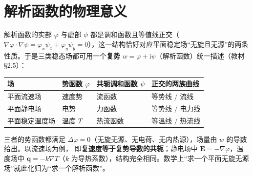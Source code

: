 \section{解析函数的物理意义}

解析函数的实部 \(\varphi\) 与虚部 \(\psi\) 都是调和函数且等值线正交（\(\nabla\varphi\cdot\nabla\psi=\varphi_{x}\psi_{x}+\varphi_{y}\psi_{y}=0\)），这一结构恰好对应平面稳定场“无旋且无源”的两条性质。于是三类稳态场都可用一个\textbf{复势} \(w=\varphi+\mathrm{i}\psi\)（解析函数）统一描述（教材 §2.5）：

\begin{center}
\begin{tabular}{llll}
\toprule
场 & 势函数 \(\varphi\) & 共轭调和函数 \(\psi\) & 正交的两族曲线 \\
\midrule
平面流速场 & 速度势 & 流函数 & 等势线 / 流线 \\
平面静电场 & 电势 & 力函数 & 等势线 / 电力线 \\
平面稳定温度场 & 温度 \(T\) & 热流函数 & 等温线 / 热流线 \\
\bottomrule
\end{tabular}
\end{center}

三者的势函数都满足 \(\Delta\varphi=0\)（无旋无源、无电荷、无内热源），场量由 \(w\) 的导数给出。以流速场为例，
即\textbf{复速度等于复势导数的共轭}；静电场中 \(\boldsymbol{E}=-\nabla\varphi\)，温度场中 \(\boldsymbol{q}=-k\nabla T\)（\(k\) 为导热系数），结构完全相同。数学上“求一个平面无旋无源场”就此化归为“求一个解析函数”。

